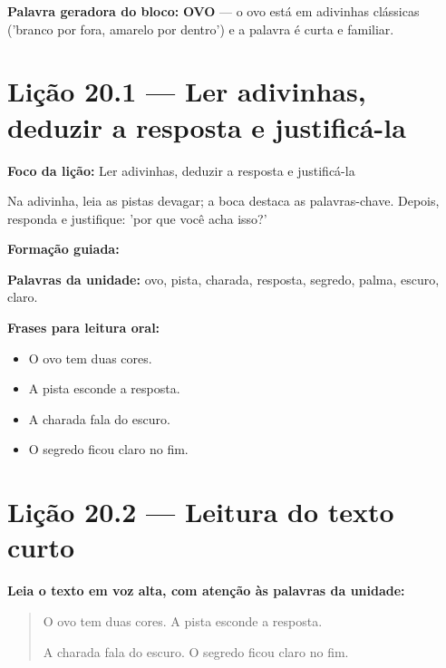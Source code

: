 \textbf{Palavra geradora do bloco:} \textbf{OVO} --- o ovo está em adivinhas clássicas ('branco por fora, amarelo por dentro') e a palavra é curta e familiar.

\section{Lição 20.1 --- Ler adivinhas, deduzir a resposta e justificá-la}

\textbf{Foco da lição:} Ler adivinhas, deduzir a resposta e justificá-la


\begin{boquinha}
Na adivinha, leia as pistas devagar; a boca destaca as palavras-chave. Depois, responda e justifique: 'por que você acha isso?'
\end{boquinha}

\noindent\textbf{Formação guiada:}

\begin{center}
\end{center}

\noindent\textbf{Palavras da unidade:} ovo, pista, charada, resposta, segredo, palma, escuro, claro.

\noindent\textbf{Frases para leitura oral:}
\begin{itemize}[leftmargin=1.6em]
  \item O ovo tem duas cores.
  \item A pista esconde a resposta.
  \item A charada fala do escuro.
  \item O segredo ficou claro no fim.
\end{itemize}

\section{Lição 20.2 --- Leitura do texto curto}

\noindent\textbf{Leia o texto em voz alta, com atenção às palavras da unidade:}


\begin{quote}
O ovo tem duas cores. A pista esconde a resposta.

A charada fala do escuro. O segredo ficou claro no fim.
\end{quote}


